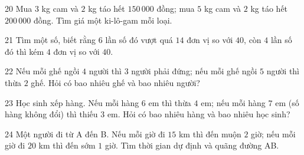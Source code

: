 \gap
\begin{probbox}{20}{\relax}
Mua $3$ kg cam và $2$ kg táo hết $150\,000$ đồng; mua $5$ kg cam và $2$ kg táo hết $200\,000$ đồng. Tìm giá một ki-lô-gam mỗi loại.
\end{probbox}
\gap
\begin{probbox}{21}{\relax}
Tìm một số, biết rằng $6$ lần số đó vượt quá $14$ đơn vị so với $40$, còn $4$ lần số đó thì kém $4$ đơn vị so với $40$.
\end{probbox}
\gap
\begin{probbox}{22}{\relax}
Nếu mỗi ghế ngồi $4$ người thì $3$ người phải đứng; nếu mỗi ghế ngồi $5$ người thì thừa $2$ ghế. Hỏi có bao nhiêu ghế và bao nhiêu người?
\end{probbox}
\gap
\begin{probbox}{23}{\relax}
Học sinh xếp hàng. Nếu mỗi hàng $6$ em thì thừa $4$ em; nếu mỗi hàng $7$ em (số hàng không đổi) thì thiếu $3$ em. Hỏi có bao nhiêu hàng và bao nhiêu học sinh?
\end{probbox}
\gap
\begin{probbox}{24}{\relax}
Một người đi từ A đến B. Nếu mỗi giờ đi $15$ km thì đến muộn $2$ giờ; nếu mỗi giờ đi $20$ km thì đến sớm $1$ giờ. Tìm thời gian dự định và quãng đường AB.
\end{probbox}
